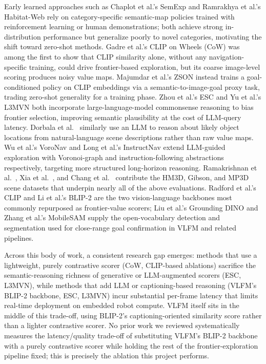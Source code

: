 \documentclass[conference]{IEEEtran}
\begin{document}
Early learned approaches such as Chaplot et al.'s SemExp \cite{semexp} and Ramrakhya et al.'s Habitat-Web \cite{habitatweb} rely on category-specific semantic-map policies trained with reinforcement learning or human demonstrations; both achieve strong in-distribution performance but generalize poorly to novel categories, motivating the shift toward zero-shot methods. Gadre et al.'s CLIP on Wheels (CoW) \cite{cow} was among the first to show that CLIP similarity alone, without any navigation-specific training, could drive frontier-based exploration, but its coarse image-level scoring produces noisy value maps. Majumdar et al.'s ZSON \cite{zson} instead trains a goal-conditioned policy on CLIP embeddings via a semantic-to-image-goal proxy task, trading zero-shot generality for a training phase. Zhou et al.'s ESC \cite{esc} and Yu et al.'s L3MVN \cite{l3mvn} both incorporate large-language-model commonsense reasoning to bias frontier selection, improving semantic plausibility at the cost of LLM-query latency. Dorbala et al.\ \cite{catmug} similarly use an LLM to reason about likely object locations from natural-language scene descriptions rather than raw value maps. Wu et al.'s VoroNav \cite{voronav} and Long et al.'s InstructNav \cite{instructnav} extend LLM-guided exploration with Voronoi-graph and instruction-following abstractions respectively, targeting more structured long-horizon reasoning. Ramakrishnan et al.\ \cite{hm3d}, Xia et al.\ \cite{gibson}, and Chang et al.\ \cite{mp3d} contribute the HM3D, Gibson, and MP3D scene datasets that underpin nearly all of the above evaluations. Radford et al.'s CLIP \cite{clip} and Li et al.'s BLIP-2 \cite{blip2} are the two vision-language backbones most commonly repurposed as frontier-value scorers; Liu et al.'s Grounding DINO \cite{groundingdino} and Zhang et al.'s MobileSAM \cite{mobilesam} supply the open-vocabulary detection and segmentation used for close-range goal confirmation in VLFM and related pipelines.

Across this body of work, a consistent research gap emerges: methods that use a lightweight, purely contrastive scorer (CoW, CLIP-based ablations) sacrifice the semantic-reasoning richness of generative or LLM-augmented scorers (ESC, L3MVN), while methods that add LLM or captioning-based reasoning (VLFM's BLIP-2 backbone, ESC, L3MVN) incur substantial per-frame latency that limits real-time deployment on embedded robot compute. VLFM \cite{vlfm} itself sits in the middle of this trade-off, using BLIP-2's captioning-oriented similarity score rather than a lighter contrastive scorer. No prior work we reviewed systematically measures the latency/quality trade-off of substituting VLFM's BLIP-2 backbone with a purely contrastive scorer while holding the rest of the frontier-exploration pipeline fixed; this is precisely the ablation this project performs.
\end{document}
